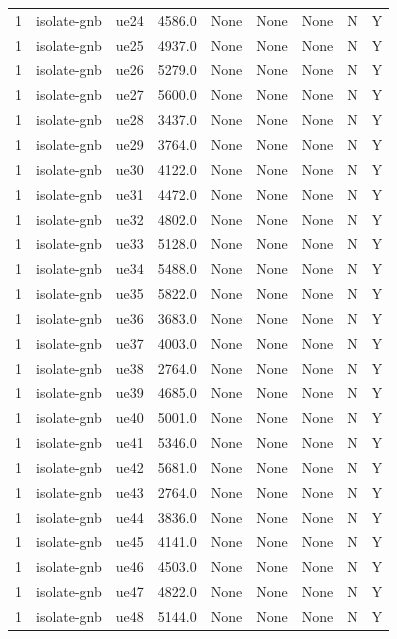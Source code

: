 \begin{table}[ht]
\begin{tabular}{|c|c|c|c|c|c|c|c|c|}
1 & isolate-gnb & ue24 & 4586.0 & None & None & None & N & Y \\
1 & isolate-gnb & ue25 & 4937.0 & None & None & None & N & Y \\
1 & isolate-gnb & ue26 & 5279.0 & None & None & None & N & Y \\
1 & isolate-gnb & ue27 & 5600.0 & None & None & None & N & Y \\
1 & isolate-gnb & ue28 & 3437.0 & None & None & None & N & Y \\
1 & isolate-gnb & ue29 & 3764.0 & None & None & None & N & Y \\
1 & isolate-gnb & ue30 & 4122.0 & None & None & None & N & Y \\
1 & isolate-gnb & ue31 & 4472.0 & None & None & None & N & Y \\
1 & isolate-gnb & ue32 & 4802.0 & None & None & None & N & Y \\
1 & isolate-gnb & ue33 & 5128.0 & None & None & None & N & Y \\
1 & isolate-gnb & ue34 & 5488.0 & None & None & None & N & Y \\
1 & isolate-gnb & ue35 & 5822.0 & None & None & None & N & Y \\
1 & isolate-gnb & ue36 & 3683.0 & None & None & None & N & Y \\
1 & isolate-gnb & ue37 & 4003.0 & None & None & None & N & Y \\
1 & isolate-gnb & ue38 & 2764.0 & None & None & None & N & Y \\
1 & isolate-gnb & ue39 & 4685.0 & None & None & None & N & Y \\
1 & isolate-gnb & ue40 & 5001.0 & None & None & None & N & Y \\
1 & isolate-gnb & ue41 & 5346.0 & None & None & None & N & Y \\
1 & isolate-gnb & ue42 & 5681.0 & None & None & None & N & Y \\
1 & isolate-gnb & ue43 & 2764.0 & None & None & None & N & Y \\
1 & isolate-gnb & ue44 & 3836.0 & None & None & None & N & Y \\
1 & isolate-gnb & ue45 & 4141.0 & None & None & None & N & Y \\
1 & isolate-gnb & ue46 & 4503.0 & None & None & None & N & Y \\
1 & isolate-gnb & ue47 & 4822.0 & None & None & None & N & Y \\
1 & isolate-gnb & ue48 & 5144.0 & None & None & None & N & Y \\

\end{tabular}
\end{table}
